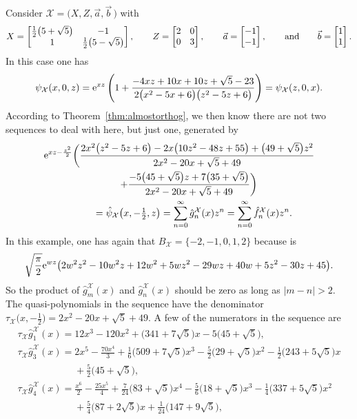 \documentclass[pdftex]{sigma}
\numberwithin{equation}{section}
\theoremstyle{definition}
\def\X{\mathcal{X}}
\def\ff{\hat f}
\def\gg{\hat g}
\begin{document}
Consider $\X=\bigl(X,Z,\vec a,\vec b\,\bigr)$ with
\[
X=\left[\begin{matrix}
\frac{1}{2}
 \bigl(5+\sqrt{5}\bigr) & -1
 \\
 1 & \frac{1}{2}
 \bigl(5-\sqrt{5}\bigr) \end{matrix}\right],\qquad
Z=\left[\begin{matrix}
 2 & 0 \\
 0 & 3 \end{matrix}\right],\qquad
\vec a=\left[\begin{matrix}
 -1 \\
 -1 \end{matrix}\right],\qquad \hbox{and}\qquad
\vec b=\left[\begin{matrix}
1 \\
 1 \end{matrix}\right].
\]
In this case one has
\[
\psi_{\X}(x,0,z)={\rm e}^{x z} \left(1+\frac{-4 x z+10
 x+10 z+\sqrt{5}-23}{2
 \bigl(x^2-5 x+6\bigr)
 \bigl(z^2-5
 z+6\bigr)}\right)
=\psi_{\X}(z,0,x).
\]
According to Theorem~\ref{thm:almostorthog}, we then know there are
not two sequences to deal with here, but just one, generated by
\begin{gather*}
{\rm e}^{x z-\frac{z^2}{2}}\bigg(
 \frac{
2 x^2 \bigl(z^2-5 z+6\bigr)-2 x \bigl(10 z^2-48 z+55\bigr)+\bigl(49+\sqrt{5}\bigr)
 z^2
 }{2 x^2-20 x+\sqrt{5}+49}\\
 \qquad+\frac{
-5 \bigl(45+\sqrt{5}\bigr) z+7 \bigl(35+\sqrt{5}\bigr)
 }{2 x^2-20 x+\sqrt{5}+49}\bigg)
 \\
 \phantom{\qquad+}{}=\hat\psi_{\X}\bigl(x,-\tfrac{1}{2},z\bigr)
 =\sum_{n=0}^{\infty}\gg_n^{\X}(x)z^n=\sum_{n=0}^{\infty}\ff_n^{\X}(x)z^n.
\end{gather*}
 In this example, one has again that $B_{\X}=\{-2,-1,0,1,2\}$ because
\smash{$ \hat{\hat\psi}_{\X}(w,0,z)$} is
 \[
\sqrt{\frac{\pi }{2}} {\rm e}^{w z}
 \bigl(2 w^2 z^2-10 w^2 z+12
 w^2+5 w z^2-29 w z+40 w+5
 z^2-30 z+45\bigr).
 \]
 So
 the product of $\gg_m^{\X}(x)$ and $\gg_n^{\X}(x)$ should be
 zero as long as $|m-n|>2$. The quasi-polynomials in the sequence have the denominator
$ \tau_{\X}\bigl(x,-\tfrac{1}{2}\bigr)=2 x^2-20 x+\sqrt{5}+49$. A few of the numerators
in the sequence are
\begin{gather*}
\tau_{\X} \gg_1^{\X}(x)=12 x^3-120 x^2+\bigl(341+7
 \sqrt{5}\bigr) x-5
 \bigl(45+\sqrt{5}\bigr),\\
 \tau_{\X}\gg_3^{\X}(x)=2 x^5-\frac{70 x^4}{3}+\frac{1}{6}
 \bigl(509+7 \sqrt{5}\bigr)
 x^3-\frac{5}{2}
 \bigl(29+\sqrt{5}\bigr)
 x^2-\frac{1}{2} \bigl(243+5
 \sqrt{5}\bigr) x\\
 \phantom{ \tau_{\X}\gg_3^{\X}(x)=}{}+\frac{5}{2}
 \bigl(45+\sqrt{5}\bigr),
\\
\tau_{\X} \gg_4^{\X}(x)=\frac{x^6}{2}-\frac{25
 x^5}{4}+\frac{7}{24}
 \bigl(83+\sqrt{5}\bigr)
 x^4-\frac{5}{6}
 \bigl(18+\sqrt{5}\bigr)
 x^3-\frac{1}{4} \bigl(337+5
 \sqrt{5}\bigr) x^2\\
 \phantom{\tau_{\X} \gg_4^{\X}(x)=}{}+\frac{5}{4}
 \bigl(87+2 \sqrt{5}\bigr)
 x+\frac{1}{24} \bigl(147+9
 \sqrt{5}\bigr),
\end{gather*}
\end{document}
